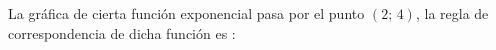\documentclass[border=10pt]{standalone}
\begin{document}
La gráfica de cierta función exponencial pasa por el punto $(2;\,4)$, la regla de correspondencia de dicha función es :

\end{document}
